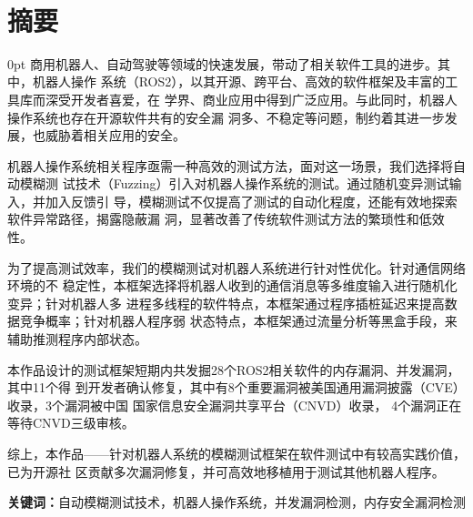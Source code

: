 \documentclass[zihao=-4]{ctexart}
\newcommand{\sanhao}{\fontsize{16pt}{0}}
\newcommand{\xiaosi}{\fontsize{12pt}{0}}
\newcommand{\setParDis}{\setlength {\parskip} {0pt} }
\begin{document}
\par \ 
\begin{center}
\sanhao
\centerline{\heiti{}}%
\end{center}



\renewcommand{\headrulewidth}{0pt}%
\clearpage
{} %

\xiaosi
\section*{摘要}
\begin{spacing}{1.5}
  \setParDis %
商用机器人、自动驾驶等领域的快速发展，带动了相关软件工具的进步。其中，机器人操作
系统（ROS2），以其开源、跨平台、高效的软件框架及丰富的工具库而深受开发者喜爱，在
学界、商业应用中得到广泛应用。与此同时，机器人操作系统也存在开源软件共有的安全漏
洞多、不稳定等问题，制约着其进一步发展，也威胁着相关应用的安全。

机器人操作系统相关程序亟需一种高效的测试方法，面对这一场景，我们选择将自动模糊测
试技术（Fuzzing）引入对机器人操作系统的测试。通过随机变异测试输入，并加入反馈引
导，模糊测试不仅提高了测试的自动化程度，还能有效地探索软件异常路径，揭露隐蔽漏
洞，显著改善了传统软件测试方法的繁琐性和低效性。

为了提高测试效率，我们的模糊测试对机器人系统进行针对性优化。针对通信网络环境的不
稳定性，本框架选择将机器人收到的通信消息等多维度输入进行随机化变异；针对机器人多
进程多线程的软件特点，本框架通过程序插桩延迟来提高数据竞争概率；针对机器人程序弱
状态特点，本框架通过流量分析等黑盒手段，来辅助推测程序内部状态。

本作品设计的测试框架短期内共发掘28个ROS2相关软件的内存漏洞、并发漏洞，其中11个得
到开发者确认修复，其中有8个重要漏洞被美国通用漏洞披露（CVE）收录，3个漏洞被中国
国家信息安全漏洞共享平台（CNVD）收录， 4个漏洞正在等待CNVD三级审核。

综上，本作品——针对机器人系统的模糊测试框架在软件测试中有较高实践价值，已为开源社
区贡献多次漏洞修复，并可高效地移植用于测试其他机器人程序。


\end{spacing}
    
\textbf{关键词：}自动模糊测试技术，机器人操作系统，并发漏洞检测，内存安全漏洞检测

\newpage
\end{document}
